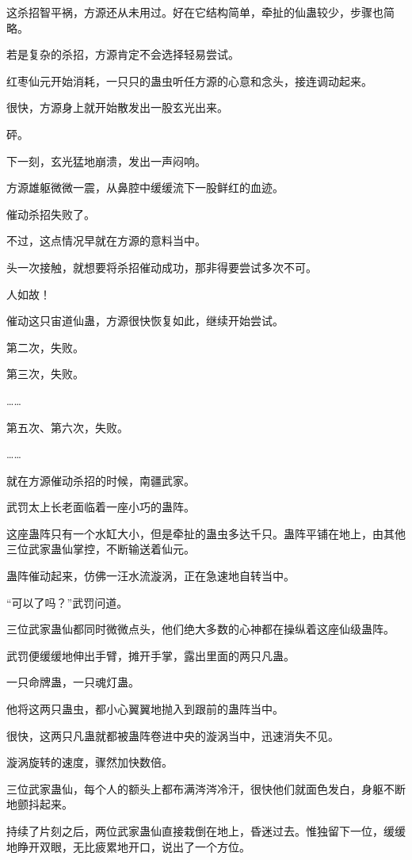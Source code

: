 \begin{this_body}
这杀招智平祸，方源还从未用过。好在它结构简单，牵扯的仙蛊较少，步骤也简略。

若是复杂的杀招，方源肯定不会选择轻易尝试。

红枣仙元开始消耗，一只只的蛊虫听任方源的心意和念头，接连调动起来。

很快，方源身上就开始散发出一股玄光出来。

砰。

下一刻，玄光猛地崩溃，发出一声闷响。

方源雄躯微微一震，从鼻腔中缓缓流下一股鲜红的血迹。

催动杀招失败了。

不过，这点情况早就在方源的意料当中。

头一次接触，就想要将杀招催动成功，那非得要尝试多次不可。

人如故！

催动这只宙道仙蛊，方源很快恢复如此，继续开始尝试。

第二次，失败。

第三次，失败。

……

第五次、第六次，失败。

……

就在方源催动杀招的时候，南疆武家。

武罚太上长老面临着一座小巧的蛊阵。

这座蛊阵只有一个水缸大小，但是牵扯的蛊虫多达千只。蛊阵平铺在地上，由其他三位武家蛊仙掌控，不断输送着仙元。

蛊阵催动起来，仿佛一汪水流漩涡，正在急速地自转当中。

“可以了吗？”武罚问道。

三位武家蛊仙都同时微微点头，他们绝大多数的心神都在操纵着这座仙级蛊阵。

武罚便缓缓地伸出手臂，摊开手掌，露出里面的两只凡蛊。

一只命牌蛊，一只魂灯蛊。

他将这两只蛊虫，都小心翼翼地抛入到跟前的蛊阵当中。

很快，这两只凡蛊就都被蛊阵卷进中央的漩涡当中，迅速消失不见。

漩涡旋转的速度，骤然加快数倍。

三位武家蛊仙，每个人的额头上都布满涔涔冷汗，很快他们就面色发白，身躯不断地颤抖起来。

持续了片刻之后，两位武家蛊仙直接栽倒在地上，昏迷过去。惟独留下一位，缓缓地睁开双眼，无比疲累地开口，说出了一个方位。


\end{this_body}
